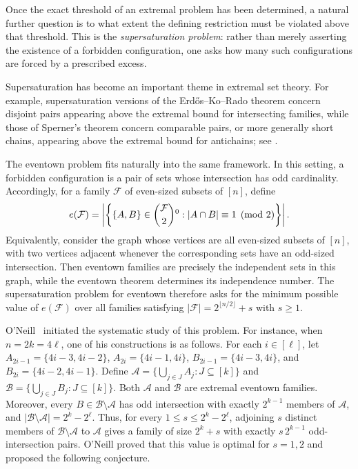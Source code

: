 \documentclass[11pt]{article}
\begin{document}
Once the exact threshold of an extremal problem has been determined, a natural further question is to what extent the defining restriction must be violated above that threshold. This is the \emph{supersaturation problem}: rather than merely asserting the existence of a forbidden configuration, one asks how many such configurations are forced by a prescribed excess.

Supersaturation has become an important theme in extremal set theory. For example, supersaturation versions of the Erd\H{o}s--Ko--Rado theorem concern disjoint pairs appearing above the extremal bound for intersecting
families, while those of Sperner's theorem concern comparable pairs, or
more generally short chains, appearing above the extremal bound for
antichains; see
\cite{BaloghLiuSharifzadehDasTran,BaloghWagner,BollobasLeader,DasGanSudakov1,DasGanSudakov2}.

The eventown problem fits naturally into the same framework. In this setting, a forbidden configuration is a pair of sets whose intersection has odd cardinality. Accordingly, for a family \(\mathcal F\) of even-sized subsets of \([n]\), define
\[
e(\mathcal F)
=
\left|
\left\{
\{A,B\}\in\binom{\mathcal F}{2}\text{\footnotemark[\value{footnote}]}:
|A\cap B|\equiv 1\pmod 2
\right\}
\right|.
\]
Equivalently, consider the graph whose vertices are all even-sized subsets of \([n]\), with two vertices adjacent whenever the corresponding sets have an odd-sized intersection. Then eventown families are precisely the independent sets in this graph, while the eventown theorem determines its independence number. The supersaturation problem for eventown therefore asks for the minimum possible value of \(e(\mathcal F)\) over all families satisfying \(|\mathcal F|=2^{\lfloor n/2\rfloor}+s\) with \(s\ge 1\).

O'Neill~\cite{ONeill} initiated the systematic study of this problem.
For instance, when \(n=2k=4\ell\), one of his constructions is as follows. For each
\(i\in[\ell]\), let
\(A_{2i-1}=\{4i-3,4i-2\}\), \(A_{2i}=\{4i-1,4i\}\),
\(B_{2i-1}=\{4i-3,4i\}\), and \(B_{2i}=\{4i-2,4i-1\}\). Define
\(\mathcal A=\{\bigcup_{j\in J}A_j:J\subseteq[k]\}\) and
\(\mathcal B=\{\bigcup_{j\in J}B_j:J\subseteq[k]\}\).
Both \(\mathcal A\) and \(\mathcal B\) are extremal eventown families.
Moreover, every \(B\in\mathcal B\setminus\mathcal A\) has odd intersection
with exactly \(2^{k-1}\) members of \(\mathcal A\),
and \(|\mathcal B\setminus\mathcal A|=2^k-2^\ell\). Thus, for every
\(1\le s\le 2^k-2^\ell\), adjoining \(s\) distinct members of
\(\mathcal B\setminus\mathcal A\) to \(\mathcal A\) gives a family of
size \(2^k+s\) with exactly \(s\,2^{k-1}\) odd-intersection pairs.
O'Neill proved that this value is optimal for \(s=1,2\) and proposed
the following conjecture.
\end{document}
